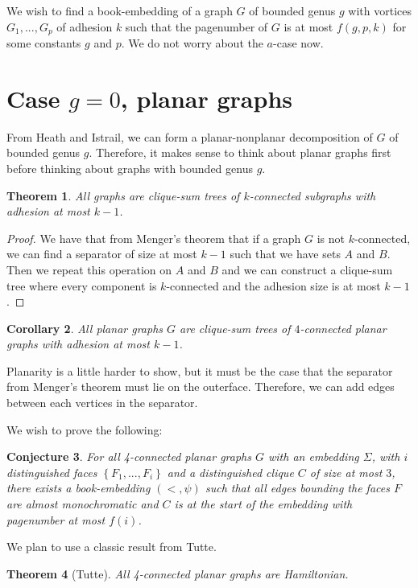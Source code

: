 \documentclass[]{report}
\newtheorem{theorem}{Theorem}
\newtheorem{corollary}[theorem]{Corollary}
\newtheorem{conjecture}[theorem]{Conjecture}
\theoremstyle{definition}
\numberwithin{theorem}{section}
\numberwithin{equation}{section}
\begin{document}
We wish to find a book-embedding of a graph $G$ of bounded genus $g$ with vortices $G_1, ..., G_p$ of adhesion $k$ such that the pagenumber of $G$ is at most $f(g, p, k)$ for some constants $g$ and $p$. We do not worry about the $a$-case now.

\section{Case $g = 0$, planar graphs}
From Heath and Istrail, we can form a planar-nonplanar decomposition of $G$ of bounded genus $g$. Therefore, it makes sense to think about planar graphs first before thinking about graphs with bounded genus $g$.
\begin{theorem}\label{thm:clique_sum_connected}
	All graphs are clique-sum trees of $k$-connected subgraphs with adhesion at most $k-1$.
\end{theorem}
\begin{proof}
	We have that from Menger's theorem that if a graph $G$ is not $k$-connected, we can find a separator of size at most $k-1$ such that we have sets $A$ and $B$. Then we repeat this operation on $A$ and $B$ and we can construct a clique-sum tree where every component is $k$-connected and the adhesion size is at most $k-1$. 
\end{proof}

\begin{corollary}\label{corr:planar_graphs_4_connected_cliqesums}
	All planar graphs $G$ are clique-sum trees of $4$-connected planar graphs with adhesion at most $k-1$.
\end{corollary}
Planarity is a little harder to show, but it must be the case that the separator from Menger's theorem must lie on the outerface. Therefore, we can add edges between each vertices in the separator. 

We wish to prove the following:

\begin{conjecture}\label{conj:4-planar graphs}
	For all 4-connected planar graphs $G$ with an embedding $\Sigma$, with $i$ distinguished faces $\left\lbrace F_1, ..., F_i \right\rbrace$ and a distinguished clique $C$ of size at most $3$, there exists a book-embedding $(<, \psi)$ such that all edges bounding the faces $F$ are almost monochromatic and $C$ is at the start of the embedding with pagenumber at most $f(i)$.
\end{conjecture}
We plan to use a classic result from Tutte.
\begin{theorem}[Tutte\cite{tutteTheoremPlanarGraphs1956}]\label{thm:4-connected_planar_ham_cycle}
	All 4-connected planar graphs are Hamiltonian.
\end{theorem}
\end{document}

